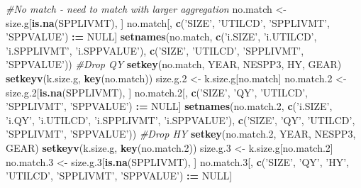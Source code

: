 \documentclass[]{article}
\newenvironment{Shaded}{\begin{snugshade}}{\end{snugshade}}
\newcommand{\KeywordTok}[1]{\textcolor[rgb]{0.13,0.29,0.53}{\textbf{#1}}}
\newcommand{\DecValTok}[1]{\textcolor[rgb]{0.00,0.00,0.81}{#1}}
\newcommand{\StringTok}[1]{\textcolor[rgb]{0.31,0.60,0.02}{#1}}
\newcommand{\CommentTok}[1]{\textcolor[rgb]{0.56,0.35,0.01}{\textit{#1}}}
\newcommand{\OtherTok}[1]{\textcolor[rgb]{0.56,0.35,0.01}{#1}}
\newcommand{\OperatorTok}[1]{\textcolor[rgb]{0.81,0.36,0.00}{\textbf{#1}}}
\newcommand{\ErrorTok}[1]{\textcolor[rgb]{0.64,0.00,0.00}{\textbf{#1}}}
\newcommand{\NormalTok}[1]{#1}
\begin{document}
\begin{Shaded}
\begin{Highlighting}[]
  \CommentTok{#No match - need to match with larger aggregation}
\NormalTok{  no.match  <-}\StringTok{ }\NormalTok{size.g[}\KeywordTok{is.na}\NormalTok{(SPPLIVMT), ]}
\NormalTok{  no.match[, }\KeywordTok{c}\NormalTok{(}\StringTok{'SIZE'}\NormalTok{, }\StringTok{'UTILCD'}\NormalTok{, }\StringTok{'SPPLIVMT'}\NormalTok{, }\StringTok{'SPPVALUE'}\NormalTok{) }\OperatorTok{:}\ErrorTok{=}\StringTok{ }\OtherTok{NULL}\NormalTok{]}
  \KeywordTok{setnames}\NormalTok{(no.match, }\KeywordTok{c}\NormalTok{(}\StringTok{'i.SIZE'}\NormalTok{, }\StringTok{'i.UTILCD'}\NormalTok{, }\StringTok{'i.SPPLIVMT'}\NormalTok{, }\StringTok{'i.SPPVALUE'}\NormalTok{), }
           \KeywordTok{c}\NormalTok{(}\StringTok{'SIZE'}\NormalTok{, }\StringTok{'UTILCD'}\NormalTok{, }\StringTok{'SPPLIVMT'}\NormalTok{, }\StringTok{'SPPVALUE'}\NormalTok{))}
  \CommentTok{#Drop QY}
  \KeywordTok{setkey}\NormalTok{(no.match, YEAR, NESPP3, HY, GEAR)}
  \KeywordTok{setkeyv}\NormalTok{(k.size.g, }\KeywordTok{key}\NormalTok{(no.match))}
\NormalTok{  size.g.}\DecValTok{2}\NormalTok{ <-}\StringTok{ }\NormalTok{k.size.g[no.match]}
\NormalTok{  no.match.}\DecValTok{2}\NormalTok{ <-}\StringTok{ }\NormalTok{size.g.}\DecValTok{2}\NormalTok{[}\KeywordTok{is.na}\NormalTok{(SPPLIVMT), ]}
\NormalTok{  no.match.}\DecValTok{2}\NormalTok{[, }\KeywordTok{c}\NormalTok{(}\StringTok{'SIZE'}\NormalTok{, }\StringTok{'QY'}\NormalTok{, }\StringTok{'UTILCD'}\NormalTok{, }\StringTok{'SPPLIVMT'}\NormalTok{, }\StringTok{'SPPVALUE'}\NormalTok{) }\OperatorTok{:}\ErrorTok{=}\StringTok{ }\OtherTok{NULL}\NormalTok{]}
  \KeywordTok{setnames}\NormalTok{(no.match.}\DecValTok{2}\NormalTok{, }\KeywordTok{c}\NormalTok{(}\StringTok{'i.SIZE'}\NormalTok{, }\StringTok{'i.QY'}\NormalTok{, }\StringTok{'i.UTILCD'}\NormalTok{, }\StringTok{'i.SPPLIVMT'}\NormalTok{, }\StringTok{'i.SPPVALUE'}\NormalTok{), }
           \KeywordTok{c}\NormalTok{(}\StringTok{'SIZE'}\NormalTok{, }\StringTok{'QY'}\NormalTok{, }\StringTok{'UTILCD'}\NormalTok{, }\StringTok{'SPPLIVMT'}\NormalTok{, }\StringTok{'SPPVALUE'}\NormalTok{))}
  \CommentTok{#Drop HY}
  \KeywordTok{setkey}\NormalTok{(no.match.}\DecValTok{2}\NormalTok{, YEAR, NESPP3, GEAR)}
  \KeywordTok{setkeyv}\NormalTok{(k.size.g, }\KeywordTok{key}\NormalTok{(no.match.}\DecValTok{2}\NormalTok{))}
\NormalTok{  size.g.}\DecValTok{3}\NormalTok{ <-}\StringTok{ }\NormalTok{k.size.g[no.match.}\DecValTok{2}\NormalTok{]}
\NormalTok{  no.match.}\DecValTok{3}\NormalTok{ <-}\StringTok{ }\NormalTok{size.g.}\DecValTok{3}\NormalTok{[}\KeywordTok{is.na}\NormalTok{(SPPLIVMT), ]}
\NormalTok{  no.match.}\DecValTok{3}\NormalTok{[, }\KeywordTok{c}\NormalTok{(}\StringTok{'SIZE'}\NormalTok{, }\StringTok{'QY'}\NormalTok{, }\StringTok{'HY'}\NormalTok{, }\StringTok{'UTILCD'}\NormalTok{, }\StringTok{'SPPLIVMT'}\NormalTok{, }\StringTok{'SPPVALUE'}\NormalTok{) }\OperatorTok{:}\ErrorTok{=}\StringTok{ }\OtherTok{NULL}\NormalTok{]}

\end{Highlighting}
\end{Shaded}
\end{document}
